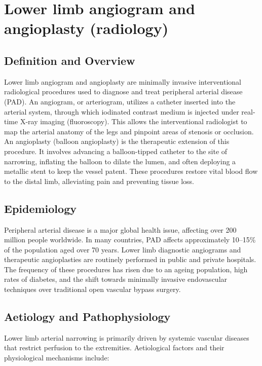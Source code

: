 \chapter{Lower limb angiogram and angioplasty (radiology)}

\section*{Definition and Overview}
Lower limb angiogram and angioplasty are minimally invasive interventional radiological procedures used to diagnose and treat peripheral arterial disease (PAD). An angiogram, or arteriogram, utilizes a catheter inserted into the arterial system, through which iodinated contrast medium is injected under real-time X-ray imaging (fluoroscopy). This allows the interventional radiologist to map the arterial anatomy of the legs and pinpoint areas of stenosis or occlusion. An angioplasty (balloon angioplasty) is the therapeutic extension of this procedure. It involves advancing a balloon-tipped catheter to the site of narrowing, inflating the balloon to dilate the lumen, and often deploying a metallic stent to keep the vessel patent. These procedures restore vital blood flow to the distal limb, alleviating pain and preventing tissue loss.

\section*{Epidemiology}
Peripheral arterial disease is a major global health issue, affecting over 200 million people worldwide. In many countries, PAD affects approximately 10--15\% of the population aged over 70 years. Lower limb diagnostic angiograms and therapeutic angioplasties are routinely performed in public and private hospitals. The frequency of these procedures has risen due to an ageing population, high rates of diabetes, and the shift towards minimally invasive endovascular techniques over traditional open vascular bypass surgery.

\section*{Aetiology and Pathophysiology}
Lower limb arterial narrowing is primarily driven by systemic vascular diseases that restrict perfusion to the extremities. Aetiological factors and their physiological mechanisms include:

